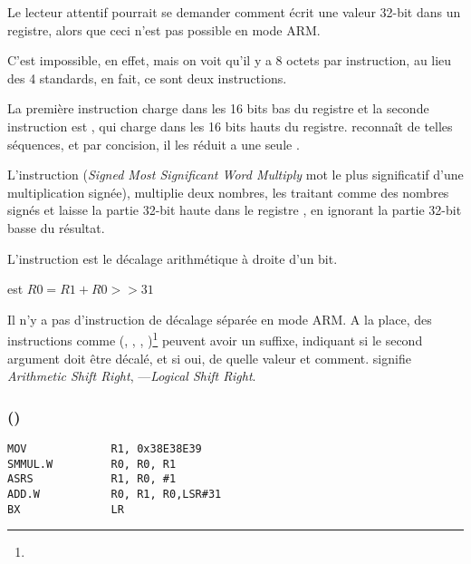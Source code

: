 
Le lecteur attentif pourrait se demander comment \MOV écrit une valeur 32-bit dans
un registre, alors que ceci n'est pas possible en mode ARM.

C'est impossible, en effet, mais on voit qu'il y a 8 octets par instruction, au lieu
des 4 standards, en fait, ce sont deux instructions.

La première instruction charge  dans les 16 bits bas du registre et la
seconde instruction est , qui charge  dans les 16 bits hauts
du registre.
\IDA reconnaît de telles séquences, et par concision, il les réduit a une seule
.

L'instruction  (\emph{Signed Most Significant Word Multiply} mot le plus
significatif d'une multiplication signée), multiplie deux nombres, les traitant comme
des nombres signés et laisse la partie 32-bit haute dans le registre ,
en ignorant la partie 32-bit basse du résultat.

L'instruction  est le décalage arithmétique à droite d'un bit.

 est $R0=R1 + R0>>31$

\label{shifts_in_ARM_mode}

Il n'y a pas d'instruction de décalage séparée en mode ARM.
A la place, des instructions comme
(\MOV, \ADD, \SUB, )\footnote{\DataProcessingInstructionsFootNote}
peuvent avoir un suffixe, indiquant si le second argument doit être décalé, et si
oui, de quelle valeur et comment.
 signifie \emph{Arithmetic Shift Right}, ---\emph{Logical Shift Right}.


\subsubsection{\OptimizingXcodeIV (\ThumbTwoMode)}

\begin{lstlisting}[style=customasmARM]
MOV             R1, 0x38E38E39
SMMUL.W         R0, R0, R1
ASRS            R1, R0, #1
ADD.W           R0, R1, R0,LSR#31
BX              LR
\end{lstlisting}

